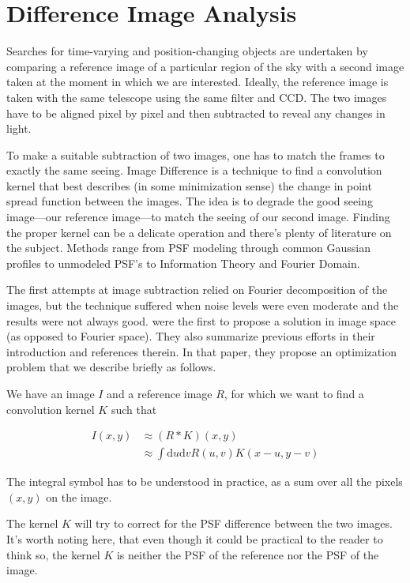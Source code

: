 \chapter{Difference Image Analysis} \label{appendix:dia}

Searches for time-varying and position-changing objects are undertaken by comparing a reference image of a particular region of the sky with a second image taken at the moment in which we are interested. Ideally, the reference image is taken with the same telescope using the same filter and CCD. The two images have to be aligned pixel by pixel and then subtracted to reveal any changes in light.

To make a suitable subtraction of two images, one has to match the frames to exactly the same seeing. Image Difference is a technique to find a convolution kernel that best describes (in some minimization sense) the change in point spread function between the images. The idea is to degrade the good seeing image---our reference image---to match the seeing of our second image. Finding the proper kernel can be a delicate operation and there's plenty of literature on the subject. Methods range from PSF modeling through common Gaussian profiles to unmodeled PSF's to Information Theory and Fourier Domain.

The first attempts at image subtraction relied on Fourier decomposition of the images, 
but the technique suffered when noise levels were even moderate and the results were not always good.
\citet{1998ApJ...503..325A} were the first to propose a solution in image space (as opposed to Fourier space). 
They also summarize previous efforts in their introduction and references therein. 
In that paper, they propose an optimization problem that we describe briefly as follows.

We have an image $I$ and a reference image $R$, for which we want to find a convolution kernel $K$ such that

\begin{align}
I(x,y) & \approx (R \mathbin{*} K)(x,y) \\
 & \approx \int \mathrm{d}u \mathrm{d}v {R (u,v) K(x-u,y-v)}
\end{align}
 
The integral symbol has to be understood in practice, as a sum over all the pixels $(x,y)$ on the image. 

The kernel $K$ will try to correct for the PSF difference between the two images.
It's worth noting here, that even though it could be practical to the reader to think so, the kernel $K$ is neither the PSF of the reference nor the PSF of the image.


